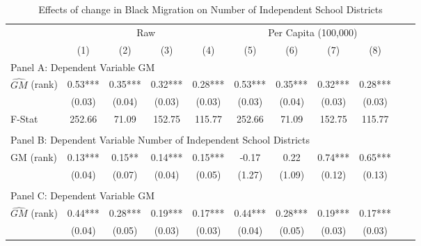  \begin{table}[htbp]\centering {} \begin{threeparttable} \caption{Effects of change in Black Migration on Number of Independent School Districts} \begin{tabular}{l*{10}{c}} \toprule
                &\multicolumn{4}{c}{Raw}                                    &\multicolumn{4}{c}{Per Capita (100,000)}                   \\\cmidrule(lr){2-5}\cmidrule(lr){6-9}
                &\multicolumn{1}{c}{(1)}   &\multicolumn{1}{c}{(2)}   &\multicolumn{1}{c}{(3)}   &\multicolumn{1}{c}{(4)}   &\multicolumn{1}{c}{(5)}   &\multicolumn{1}{c}{(6)}   &\multicolumn{1}{c}{(7)}   &\multicolumn{1}{c}{(8)}   \\
\cmidrule(lr){1-9}
\multicolumn{8}{l}{Panel A: Dependent Variable GM}\\
\cmidrule(lr){1-9}
$\hat{GM}$ (rank)&       0.53***&       0.35***&       0.32***&       0.28***&       0.53***&       0.35***&       0.32***&       0.28***\\
                &     (0.03)   &     (0.04)   &     (0.03)   &     (0.03)   &     (0.03)   &     (0.04)   &     (0.03)   &     (0.03)   \\
\midrule
F-Stat          &     252.66   &      71.09   &     152.75   &     115.77   &     252.66   &      71.09   &     152.75   &     115.77   \\
\cmidrule[\heavyrulewidth](lr){1-9} \\ \cmidrule[\heavyrulewidth](lr){1-9}
\multicolumn{8}{l}{Panel B: Dependent Variable Number of Independent School Districts}\\
\cmidrule(lr){1-9}
GM  (rank)      &       0.13***&       0.15** &       0.14***&       0.15***&      -0.17   &       0.22   &       0.74***&       0.65***\\
                &     (0.04)   &     (0.07)   &     (0.04)   &     (0.05)   &     (1.27)   &     (1.09)   &     (0.12)   &     (0.13)   \\
\cmidrule[\heavyrulewidth](lr){1-9} \\ \cmidrule[\heavyrulewidth](lr){1-9}
\multicolumn{8}{l}{Panel C: Dependent Variable GM}\\
\cmidrule(lr){1-9}
$\hat{GM}$ (rank)&       0.44***&       0.28***&       0.19***&       0.17***&       0.44***&       0.28***&       0.19***&       0.17***\\
                &     (0.04)   &     (0.05)   &     (0.03)   &     (0.03)   &     (0.04)   &     (0.05)   &     (0.03)   &     (0.03)   \\

\end{tabular}
\end{threeparttable}
\end{table}
